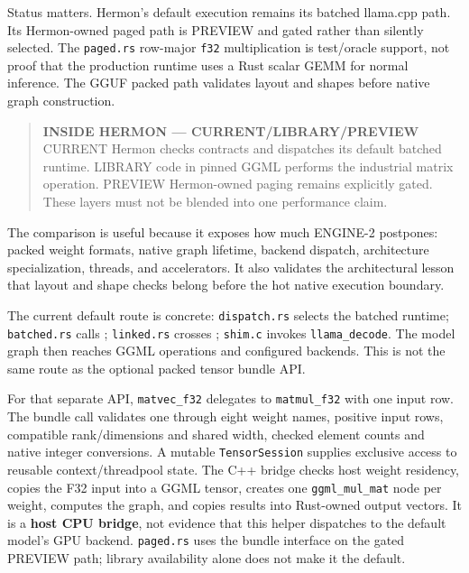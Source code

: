Status matters. Hermon's default execution remains its batched llama.cpp
path. Its Hermon-owned paged path is PREVIEW and gated rather than
silently selected. The \texttt{paged.rs} row-major \texttt{f32}
multiplication is test/oracle support, not proof that the production
runtime uses a Rust scalar GEMM for normal inference. The GGUF packed
path validates layout and shapes before native graph construction.

\begin{quote}
\textbf{INSIDE HERMON --- CURRENT/LIBRARY/PREVIEW} CURRENT Hermon checks
contracts and dispatches its default batched runtime. LIBRARY code in
pinned GGML performs the industrial matrix operation. PREVIEW
Hermon-owned paging remains explicitly gated. These layers must not be
blended into one performance claim.
\end{quote}

The comparison is useful because it exposes how much ENGINE-2 postpones:
packed weight formats, native graph lifetime, backend dispatch,
architecture specialization, threads, and accelerators. It also
validates the architectural lesson that layout and shape checks belong
before the hot native execution boundary.

The current default route is concrete: \texttt{dispatch.rs} selects the
batched runtime; \texttt{batched.rs} calls
\texttt{}; \texttt{linked.rs} crosses
\texttt{}; \texttt{shim.c}
invokes \texttt{llama\_decode}. The model graph then reaches GGML
operations and configured backends. This is not the same route as the
optional packed tensor bundle API.

For that separate API, \texttt{matvec\_f32} delegates to
\texttt{matmul\_f32} with one input row. The bundle call validates one
through eight weight names, positive input rows, compatible
rank/dimensions and shared width, checked element counts and native
integer conversions. A mutable \texttt{TensorSession} supplies exclusive
access to reusable context/threadpool state. The C++ bridge checks host
weight residency, copies the F32 input into a GGML tensor, creates one
\texttt{ggml\_mul\_mat} node per weight, computes the graph, and copies
results into Rust-owned output vectors. It is a \textbf{host CPU
bridge}, not evidence that this helper dispatches to the default model's
GPU backend. \texttt{paged.rs} uses the bundle interface on the gated
PREVIEW path; library availability alone does not make it the default.


